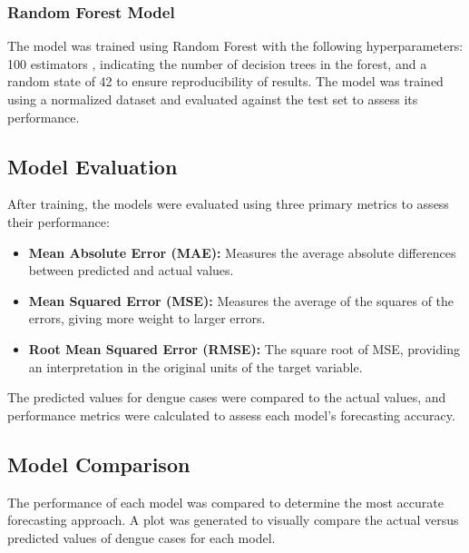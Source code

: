 \documentclass[runningheads]{llncs}
\begin{document}
\subsubsection{Random Forest Model}
The model was trained using Random Forest with the following hyperparameters: 100 estimators , indicating the number of decision trees in the forest, and a random state of 42 to ensure reproducibility of results. The model was trained using a normalized dataset and evaluated against the test set to assess its performance.

\subsection{Model Evaluation}
After training, the models were evaluated using three primary metrics to assess their performance:
\begin{itemize}
    \item \textbf{Mean Absolute Error (MAE):} Measures the average absolute differences between predicted and actual values.
    \item \textbf{Mean Squared Error (MSE):} Measures the average of the squares of the errors, giving more weight to larger errors.
    \item \textbf{Root Mean Squared Error (RMSE):} The square root of MSE, providing an interpretation in the original units of the target variable.
\end{itemize}

The predicted values for dengue cases were compared to the actual values, and performance metrics were calculated to assess each model's forecasting accuracy.

\subsection{Model Comparison}
The performance of each model was compared to determine the most accurate forecasting approach. A plot was generated to visually compare the actual versus predicted values of dengue cases for each model.

\pagebreak
\end{document}
